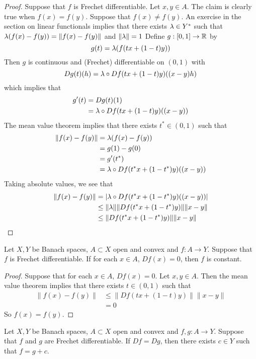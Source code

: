 \documentclass{book}
\begin{document}
	\begin{proof}
	Suppose that $f$ is Frechet differentiable. Let $x,y \in A$. The claim is clearly true when $f(x) = f(y)$. Suppose that $f(x) \neq f(y)$. An exercise in the section on linear functionals implies that there exists $\lambda \in Y^*$ such that $\lambda(f(x)-f(y)) = \| f(x) - f(y)\|$ and $\|\lambda \| = 1$
	Define $g:[0,1] \rightarrow \mathbb{R}$ by $$g(t) = \lambda(f(tx +(1-t)y))$$ Then $g$ is continuous and (Frechet) differentiable on $(0,1)$ with $$Dg(t)(h) = \lambda \circ Df(tx+(1-t)y)((x-y)h)$$ which implies that
	\begin{align*}
	g'(t) 
	&= Dg(t)(1)\\
	&= \lambda \circ Df(tx+(1-t)y)((x-y))
	\end{align*}
	The mean value theorem implies that there exists $t^* \in (0,1)$ such that 
	\begin{align*}
	\|f(x) - f(y)\|
	&= \lambda(f(x) - f(y)) \\
	&= g(1) - g(0) \\
	&= g'(t^*)\\
	&= \lambda \circ Df(t^*x+(1-t^*)y)((x-y))
	\end{align*}
	Taking absolute values, we see that 
	\begin{align*}
	\|f(x) - f(y)\|
	&= |\lambda \circ Df(t^*x+(1-t^*)y)((x-y))| \\
	& \leq \|\lambda \| \|Df(t^*x+(1-t^*)y)\|\|x-y\| \\
	& \leq \|Df(t^*x+(1-t^*)y)\|\|x-y\|
	\end{align*}
	\end{proof}
	
	\begin{ex} 
	Let $X, Y$ be Banach spaces, $A \subset X$ open and convex and $f:A \rightarrow Y$. Suppose that $f$ is Frechet differentiable. If for each $x \in A$, $Df(x) = 0$, then $f$ is constant.
	\end{ex}
	
	\begin{proof}
	Suppose that for each $x \in A$, $Df(x) = 0$. Let $x,y \in A$. Then the mean value theorem implies that there exists $t \in (0, 1)$ such that 
	\begin{align*}
	\|f(x) - f(y)\| 
	&\leq \|Df(tx + (1-t)y)\| \|x-y\| \\
	&= 0
	\end{align*}
	So $f(x) = f(y)$. 
	\end{proof}
	
	\begin{ex} 
	Let $X, Y$ be Banach spaces, $A \subset X$ open and convex and $f,g:A \rightarrow Y$. Suppose that $f$ and $g$ are Frechet differentiable. If $Df = Dg$, then there exists $c \in Y$ such that $f = g+c$.
	\end{ex}
	
\end{document}
